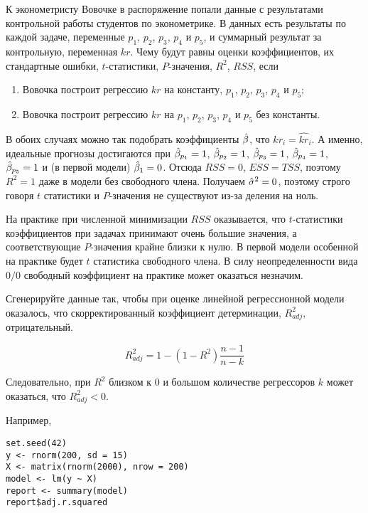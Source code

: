 \begin{problem} %
К эконометристу Вовочке в распоряжение попали данные с результатами контрольной работы студентов по эконометрике. В данных есть результаты по каждой задаче, переменные $p_1$, $p_2$, $p_3$, $p_4$ и $p_5$, и суммарный результат за контрольную, переменная $kr$. Чему будут равны оценки коэффициентов, их стандартные ошибки, $t$-статистики, $P$-значения, $R^2$, $RSS$, если
\begin{enumerate}
\item Вовочка построит регрессию $kr$ на константу, $p_1$, $p_2$, $p_3$, $p_4$ и $p_5$;
\item Вовочка построит регрессию $kr$ на $p_1$, $p_2$, $p_3$, $p_4$ и $p_5$ без константы.
\end{enumerate}


\begin{sol}
В обоих случаях можно так подобрать коэффициенты $\hat{\beta}$, что $kr_i=\widehat{kr}_i$. А именно, идеальные прогнозы достигаются при  $\hat{\beta}_{p_1}=1$, $\hat{\beta}_{p_2}=1$, $\hat{\beta}_{p_3}=1$, $\hat{\beta}_{p_4}=1$, $\hat{\beta}_{p_5}=1$ и (в первой модели) $\hat{\beta}_1=0$. Отсюда $RSS=0$, $ESS=TSS$, поэтому $R^2=1$ даже в модели без свободного члена. Получаем $\hat{\sigma}^2=0$, поэтому строго говоря $t$ статистики и $P$-значения не существуют из-за деления на ноль.

На практике при численной минимизации $RSS$ оказывается, что $t$-статистики коэффициентов при задачах принимают очень большие значения, а соответствующие $P$-значения крайне близки к нулю. В первой модели особенной на практике будет $t$ статистика свободного члена. В силу неопределенности вида $0/0$ свободный коэффициент на практике может оказаться незначим.
\end{sol}
\end{problem}





\begin{problem} %
Сгенерируйте данные так, чтобы при оценке линейной регрессионной модели оказалось, что скорректированный коэффициент детерминации, $R^2_{adj}$, отрицательный.

\begin{sol}

\[ R^2_{adj}=1-(1-R^2)\frac{n-1}{n-k} \]

Следовательно, при $R^2$ близком к 0 и большом количестве регрессоров $k$ может оказаться, что $R^2_{adj}<0$.

Например,

\begin{verbatim}
set.seed(42)
y <- rnorm(200, sd = 15)
X <- matrix(rnorm(2000), nrow = 200)
model <- lm(y ~ X)
report <- summary(model)
report$adj.r.squared
\end{verbatim}

\end{sol}
\end{problem}



